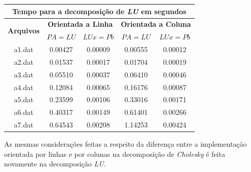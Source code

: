 \documentclass [a4paper,10pt]{article}
\newcommand{\n}[1]{\textbf{#1}}
\begin{document}
{    {\linespread{1}
        \begin{center}
            \begin{tabular}{c c c c c }
                \toprule[0.11em]
                \multicolumn{5}{c}{\n{Tempo para a decomposição de \emph{LU} em segundos}}\\
                \midrule
                \multirow{2}{*}{\n{Arquivos}} & \multicolumn{2}{c}{\n{Orientada a Linha}} & \multicolumn{2}{c}{\n{Orientada a Coluna}}\\
                \cmidrule(lr){2-3}
                \cmidrule(l){4-5}
                & \n{$PA = LU$} & \n{$LUx = Pb$} & \n{$PA = LU$} & \n{$LUx = Pb$}\\
                \cmidrule(r){1-1}
                \cmidrule(lr){2-2}
                \cmidrule(lr){3-3}
                \cmidrule(lr){4-4}
                \cmidrule(l){5-5}
                a1.dat & 0.00427 & 0.00009 & 0.00555 & 0.00012\\
                a2.dat & 0.01537 & 0.00017 & 0.01704 & 0.00019\\
                a3.dat & 0.05510 & 0.00037 & 0.06410 & 0.00046\\
                a4.dat & 0.12084 & 0.00065 & 0.16176 & 0.00087\\
                a5.dat & 0.23599 & 0.00106 & 0.33016 & 0.00171\\
                a6.dat & 0.40317 & 0.00149 & 0.61401 & 0.00266\\
                a7.dat & 0.64543 & 0.00208 & 1.14253 & 0.00424\\
                \toprule[0.11em]
            \end{tabular}
    \end{center}}

    As mesmas considerações feitas a respeito da diferença entre a implementação orientada por linhas e por colunas na decomposição de
    \emph{Cholesky} é feita novamente na decomposição \emph{LU}.

}
\end{document}
